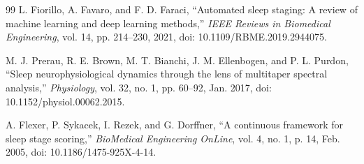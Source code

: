 \documentclass[11pt,a4paper]{article}
\begin{document}
\begin{thebibliography}{99}
 L. Fiorillo, A. Favaro, and F. D. Faraci, ``Automated sleep staging: A review of machine learning and deep learning methods,'' \textit{IEEE Reviews in Biomedical Engineering}, vol. 14, pp. 214--230, 2021, doi: 10.1109/RBME.2019.2944075.

 M. J. Prerau, R. E. Brown, M. T. Bianchi, J. M. Ellenbogen, and P. L. Purdon, ``Sleep neurophysiological dynamics through the lens of multitaper spectral analysis,'' \textit{Physiology}, vol. 32, no. 1, pp. 60--92, Jan. 2017, doi: 10.1152/physiol.00062.2015.

 A. Flexer, P. Sykacek, I. Rezek, and G. Dorffner, ``A continuous framework for sleep stage scoring,'' \textit{BioMedical Engineering OnLine}, vol. 4, no. 1, p. 14, Feb. 2005, doi: 10.1186/1475-925X-4-14.
\end{thebibliography}
\end{document}
